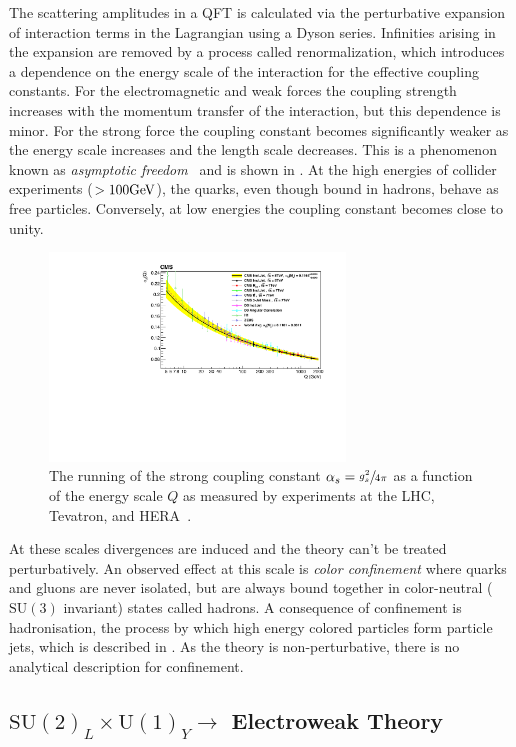 The scattering amplitudes in a QFT is calculated via the perturbative expansion of interaction terms in the Lagrangian using a Dyson series.
Infinities arising in the expansion are removed by a process called renormalization, which introduces a dependence on the energy scale of the interaction for the effective coupling constants.
For the electromagnetic and weak forces the coupling strength increases with the momentum transfer of the interaction, but this dependence is minor.
For the strong force the coupling constant becomes significantly weaker as the energy scale increases and the length scale decreases.
This is a phenomenon known as \textit{asymptotic freedom}~\cite{gross1973} and is shown in .
At the high energies of collider experiments ($ > 100 \GeV$), the quarks, even though bound in hadrons, behave as free particles.
Conversely, at low energies the coupling constant becomes close to unity.
\begin{figure}[h]
	\centering
	\includegraphics[width=0.7\textwidth]{Figures/standard_model/running}
	\caption{The running of the strong coupling constant $\alpha_s = \sfrac{g_s^2}{4\pi}$ as a function of the energy scale $Q$ as measured by experiments at the LHC, Tevatron, and HERA~\cite{CMSRunning}.}
	\label{fig:asymptotic_freedom}
\end{figure}
At these scales divergences are induced and the theory can't be treated perturbatively.
An observed effect at this scale is \textit{color confinement} where quarks and gluons are never isolated, but are always bound together in color-neutral ($\text{SU}(3)$ invariant) states called hadrons.
A consequence of confinement is hadronisation, the process by which high energy colored particles form particle jets, which is described in .
As the theory is non-perturbative, there is no analytical description for confinement.

\subsection{\texorpdfstring{$\text{SU}(2)_L \times \text{U}(1)_Y \rightarrow$}{SU(2)xSU(1)-} Electroweak Theory}
\label{sec:electroweak}

